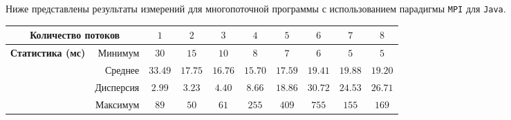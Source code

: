 Ниже представлены результаты измерений для многопоточной программы с использованием парадигмы \texttt{MPI} для \texttt{Java}.
\begin{center}
    \begin{tabular}{c|r|c|c|c|c|c|c|c|c}
        \multicolumn{2}{c|}{\textbf{Количество потоков}} & $1$ & $2$ & $3$ & $4$ & $5$ & $6$ & $7$ & $8$ \\ \hline \hline
        \multirow{4}{*}{\textbf{Статистика (мс)}} & Минимум & $30$ & $15$ & $10$ & $8$ & $7$ & $6$ & $5$ & $5$ \\
        & Среднее & $33.49$ & $17.75$ & $16.76$ & $15.70$ & $17.59$ & $19.41$ & $19.88$ & $19.20$ \\
        & Дисперсия & $2.99$ & $3.23$ & $4.40$ & $8.66$ & $18.86$ & $30.72$ & $24.53$ & $26.71$ \\
        & Максимум & $89$ & $50$ & $61$ & $255$ & $409$ & $755$ & $155$ & $169$
    \end{tabular}
\end{center}